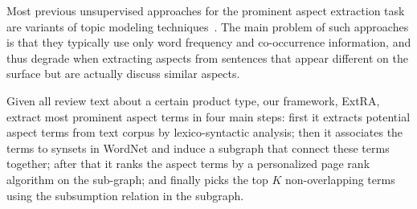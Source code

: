 Most previous unsupervised approaches for the prominent 
aspect extraction task are variants of topic modeling 
techniques~\cite{lakkaraju2011exploiting,lin2009joint,wang2011latent}.
The main problem of such approaches 
is that they typically use only word frequency and co-occurrence information, 
and thus degrade when extracting aspects from sentences that appear
different on the surface but are actually discuss similar aspects. 

Given all review text about a certain product type, our framework, ExtRA,
extract most prominent aspect terms in four main steps: 
first it extracts potential aspect terms from text corpus by lexico-syntactic 
analysis; then it associates
the terms to synsets in WordNet and induce a subgraph that connect these
terms together; after that it ranks the aspect terms by a personalized page rank
algorithm on the sub-graph; and finally picks the top $K$ non-overlapping 
terms using the subsumption relation in the subgraph. 

  
